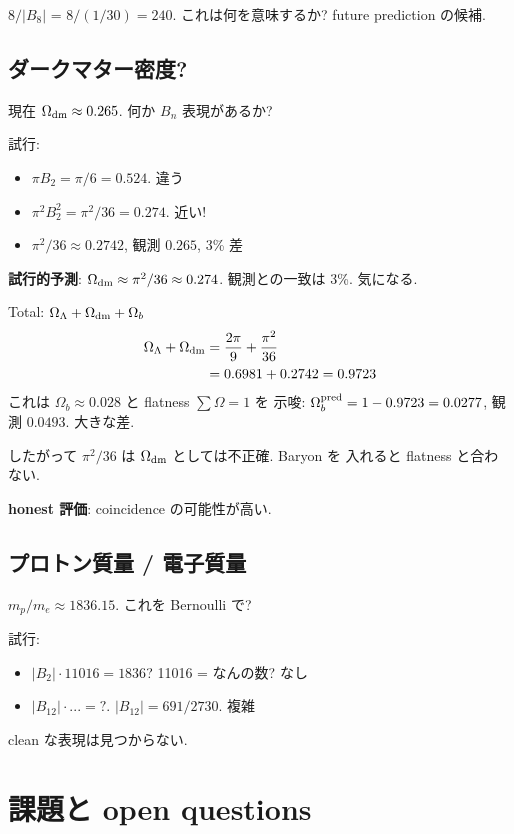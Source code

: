 \documentclass[11pt,a4paper]{article}
\begin{document}
$8/|B_8|$ = $8/(1/30) = 240$. これは何を意味するか? future prediction
の候補.

\subsection{ダークマター密度?}

現在 $\Omega_{\rm dm} \approx 0.265$. 何か $B_n$ 表現があるか?

試行:
\begin{itemize}
\item $\pi B_2 = \pi/6 = 0.524$. 違う
\item $\pi^2 B_2^2 = \pi^2/36 = 0.274$. 近い!
\item $\pi^2/36 \approx 0.2742$, 観測 $0.265$, 3\% 差
\end{itemize}

\textbf{試行的予測}: $\Omega_{\rm dm} \approx \pi^2/36 \approx 0.274$.
観測との一致は 3\%. 気になる.

Total: $\Omega_\Lambda + \Omega_{\rm dm} + \Omega_b$
\begin{align}
\Omega_\Lambda + \Omega_{\rm dm} &= \frac{2\pi}{9} + \frac{\pi^2}{36}\\
&= 0.6981 + 0.2742 = 0.9723
\end{align}
これは $\Omega_b \approx 0.028$ と flatness $\sum \Omega = 1$ を
示唆: $\Omega_b^{\rm pred} = 1 - 0.9723 = 0.0277$, 観測 $0.0493$.
大きな差.

したがって $\pi^2/36$ は $\Omega_{\rm dm}$ としては不正確. Baryon を
入れると flatness と合わない.

\textbf{honest 評価}: coincidence の可能性が高い.

\subsection{プロトン質量 / 電子質量}

$m_p/m_e \approx 1836.15$. これを Bernoulli で?

試行:
\begin{itemize}
\item $|B_2| \cdot 11016 = 1836$? 11016 = なんの数? なし
\item $|B_{12}| \cdot ... = ?$. $|B_{12}| = 691/2730$. 複雑
\end{itemize}

clean な表現は見つからない.

\section{課題と open questions}
\end{document}
